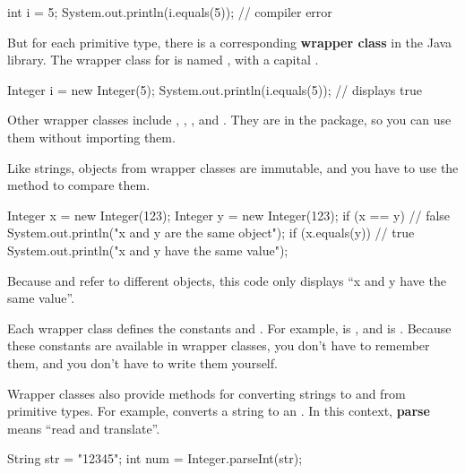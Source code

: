 \begin{code}
int i = 5;
System.out.println(i.equals(5));  // compiler error
\end{code}


But for each primitive type, there is a corresponding {\bf wrapper class} in the Java library.
The wrapper class for  is named , with a capital .

\begin{code}
Integer i = new Integer(5);
System.out.println(i.equals(5));  // displays true
\end{code}

Other wrapper classes include , , , and .
They are in the  package, so you can use them without importing them.

Like strings, objects from wrapper classes are immutable, and you have to use the  method to compare them.

\begin{code}
Integer x = new Integer(123);
Integer y = new Integer(123);
if (x == y) {                     // false
    System.out.println("x and y are the same object");
}
if (x.equals(y)) {                // true
    System.out.println("x and y have the same value");
}
\end{code}

Because  and  refer to different objects, this code only displays ``x and y have the same value''.

Each wrapper class defines the constants  and .
For example,  is , and  is .
Because these constants are available in wrapper classes, you don't have to remember them, and you don't have to write them yourself.


Wrapper classes also provide methods for converting strings to and from primitive types.
For example,  converts a string to an .
In this context, {\bf parse} means ``read and translate''.

\begin{code}
String str = "12345";
int num = Integer.parseInt(str);
\end{code}

